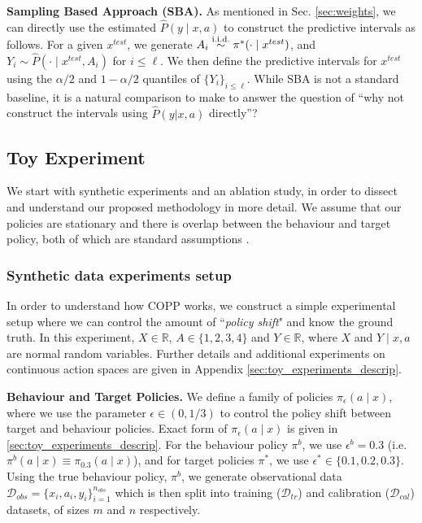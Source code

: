 \textbf{Sampling Based Approach (SBA).} As mentioned in Sec. \ref{sec:weights}, we can directly use the estimated $\hat{P}(y\mid x, a)$ to construct the predictive intervals as follows. For a given $x^{test}$, we generate $A_i \overset{\textup{i.i.d.}}{\sim} \pi^*(\cdot \mid x^{test})$, and $Y_i \sim \hat{P}(\cdot \mid x^{test}, A_i)$ for $i \leq \ell$. We then define the predictive intervals for $x^{test}$ using the $\alpha/2$ and $1-\alpha/2$ quantiles of $\{Y_i\}_{i \leq \ell}$. While SBA is not a standard baseline, it is a natural comparison to make to answer the question of ``why not construct the intervals using $\hat{P}(y|x, a)$ directly''?


\subsection{Toy Experiment}\label{sec:exp_toy} 
 We start with synthetic experiments and an ablation study, in order to dissect and understand our proposed methodology in more detail. We assume that our policies are stationary and there is overlap between the behaviour and target policy, both of which are standard assumptions \citep{risk-assessment, drobust, ope-rl}.
\subsubsection{Synthetic data experiments setup}

In order to understand how COPP works, we construct a simple experimental setup where we can control the amount of ``\textit{policy shift}" and know the ground truth. In this experiment, $X \in \mathbb{R}$, $A \in \{1, 2, 3, 4\}$ and $Y \in \mathbb{R}$, where $X$ and $Y\mid x, a$ are normal random variables. Further details and additional experiments on continuous action spaces are given in Appendix \ref{sec:toy_experiments_descrip}.   

\textbf{Behaviour and Target Policies.}
We define a family of policies $\pi_\epsilon(a \mid x)$, where we use the parameter $\epsilon \in (0,1/3)$ to control the policy shift between target and behaviour policies. Exact form of $\pi_\epsilon(a \mid x)$ is given in \ref{sec:toy_experiments_descrip}. For the behaviour policy $\pi^b$, we use $\epsilon^b = 0.3$ (i.e. $\pi^b(a \mid x) \equiv  \pi_{0.3}(a \mid x)$), and for target policies $\pi^*$, we use $\epsilon^* \in \{0.1, 0.2, 0.3\}$. Using the true behaviour policy, $\pi^b$, we generate observational data $\mathcal{D}_{obs} = \{x_i, a_i, y_i\}_{i=1}^{n_{obs}}$ which is then split into training ($\mathcal{D}_{tr}$) and calibration ($\mathcal{D}_{cal}$) datasets, of sizes $m$ and $n$ respectively.

